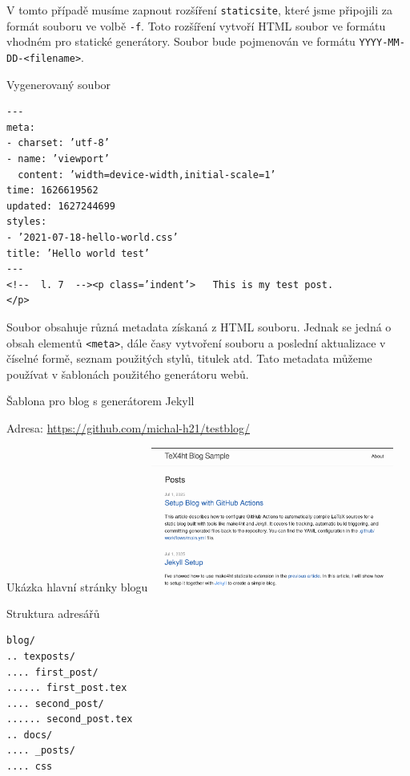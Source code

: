 V tomto případě musíme zapnout rozšíření \texttt{staticsite}, které jsme připojili za formát souboru 
ve volbě \texttt{-f}. Toto rozšíření vytvoří HTML soubor ve formátu vhodném pro statické generátory.
Soubor bude pojmenován ve formátu \verb|YYYY-MM-DD-<filename>|. 

\begin{frame}[fragile]{Vygenerovaný soubor}
  \begin{verbatim}
---
meta:
- charset: ’utf-8’
- name: ’viewport’
  content: ’width=device-width,initial-scale=1’
time: 1626619562
updated: 1627244699
styles:
- ’2021-07-18-hello-world.css’
title: ’Hello world test’
---
<!--  l. 7  --><p class=’indent’>   This is my test post.
</p>
  \end{verbatim}
\end{frame}

Soubor obsahuje různá metadata získaná z HTML souboru. Jednak se jedná 
o obsah elementů \verb|<meta>|, dále časy vytvoření souboru a poslední aktualizace v číselné formě, 
seznam použitých stylů, titulek atd. Tato metadata můžeme používat v šablonách 
použitého generátoru webů.



\begin{frame}[fragile]{Šablona pro blog s generátorem Jekyll}

\begin{block}{Adresa:}
\url{https://github.com/michal-h21/testblog/}
\end{block}

\begin{block}{Ukázka hlavní stránky blogu}
\includegraphics[width=0.6\textwidth]{img/blog.png}
\end{block}

\end{frame}

\begin{frame}[fragile]{Struktura adresářů}
\begin{verbatim}
blog/
.. texposts/
.... first_post/
...... first_post.tex
.... second_post/
...... second_post.tex
.. docs/
.... _posts/
.... css
\end{verbatim}
\end{frame}

